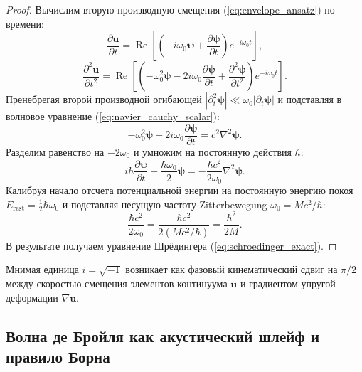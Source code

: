 \documentclass[11pt,a4paper]{article}
\theoremstyle{definition}
\theoremstyle{remark}
\begin{document}
\begin{proof}
Вычислим вторую производную смещения (\ref{eq:envelope_ansatz}) по времени:
\begin{equation}
	\frac{\partial \mathbf{u}}{\partial t} = \operatorname{Re}\left[ \left( -i\omega_0 \boldsymbol{\psi} + \frac{\partial \boldsymbol{\psi}}{\partial t} \right) e^{-i\omega_0 t} \right],
\end{equation}
\begin{equation}
	\frac{\partial^2 \mathbf{u}}{\partial t^2} = \operatorname{Re}\left[ \left( -\omega_0^2 \boldsymbol{\psi} - 2i\omega_0 \frac{\partial \boldsymbol{\psi}}{\partial t} + \frac{\partial^2 \boldsymbol{\psi}}{\partial t^2} \right) e^{-i\omega_0 t} \right].
\end{equation}
Пренебрегая второй производной огибающей $|\partial_t^2 \boldsymbol{\psi}| \ll \omega_0 |\partial_t \boldsymbol{\psi}|$ и подставляя в волновое уравнение (\ref{eq:navier_cauchy_scalar}):
\begin{equation}
	-\omega_0^2 \boldsymbol{\psi} - 2i\omega_0 \frac{\partial \boldsymbol{\psi}}{\partial t} = c^2 \nabla^2 \boldsymbol{\psi}.
\end{equation}
Разделим равенство на $-2\omega_0$ и умножим на постоянную действия $\hbar$:
\begin{equation}
	i\hbar \frac{\partial \boldsymbol{\psi}}{\partial t} + \frac{\hbar\omega_0}{2} \boldsymbol{\psi} = -\frac{\hbar c^2}{2\omega_0} \nabla^2 \boldsymbol{\psi}.
\end{equation}
Калибруя начало отсчета потенциальной энергии на постоянную энергию покоя $E_{\mathrm{rest}} = \frac{1}{2}\hbar\omega_0$ и подставляя несущую частоту Zitterbewegung $\omega_0 = M c^2 / \hbar$:
\begin{equation}
	\frac{\hbar c^2}{2\omega_0} = \frac{\hbar c^2}{2 (M c^2 / \hbar)} = \frac{\hbar^2}{2M}.
\end{equation}
В результате получаем уравнение Шрёдингера (\ref{eq:schroedinger_exact}).
\end{proof}

Мнимая единица $i = \sqrt{-1}$ возникает как фазовый кинематический сдвиг на $\pi/2$ между скоростью смещения элементов континуума $\dot{\mathbf{u}}$ и градиентом упругой деформации $\nabla \mathbf{u}$.

\subsection{Волна де Бройля как акустический шлейф и правило Борна}
\end{document}
